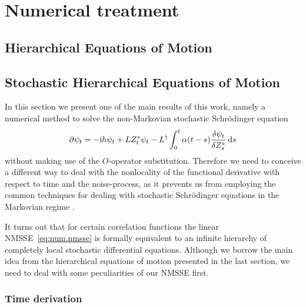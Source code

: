 \chapter{Numerical treatment}
\label{chap:num}


\section{Hierarchical Equations of Motion}
\label{sec:num.heom}


\section{Stochastic Hierarchical Equations of Motion}
\label{sec:num.sheom}
%

In this section we present one of the main results of this work, namely a numerical method to solve the non-Markovian stochastic Schrödinger equation
\begin{equation}
  \partial \psi_t = -\mathrm{i} h \psi_t + L{Z}^*_t \psi_t - L^\dagger\int_0^t \alpha(t-s) \frac{\delta\psi_t}{\delta{Z}^*_s} \, \mathrm{d} s
  \label{eq:num.nmsse}
\end{equation}
without making use of the $O$-operator substitution.
Therefore we need to conceive a different way to deal with the nonlocality of the functional derivative with respect to time and the noise-process, as it prevents us from employing the common techniques for dealing with stochastic Schrödinger equations in the Markovian regime \cite{???}.

It turns out that for certain correlation functions the linear NMSSE~\ref{eq:num.nmsse} is formally equivalent to an infinite hierarchy of completely local stochastic differential equations.
Although we borrow the main idea from the hierarchical equations of motion presented in the last section, we need to deal with some peculiarities of our NMSSE first.

\subsection{Time derivation}
\label{sub:num.sheom.time_deriv}

